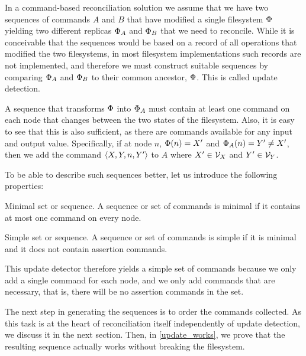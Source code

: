 
In a command-based reconciliation solution we assume that we have two sequences of commands
$A$ and $B$ that have modified a single filesystem $\Phi$ yielding two different replicas $\Phi_A$ and $\Phi_B$ that we
need to reconcile. While it is conceivable that the sequences would be based on a record of
all operations that modified the two filesystems, in most filesystem implementations
such records are not implemented, and therefore we must construct suitable sequences
by comparing $\Phi_A$ and $\Phi_B$ to their common ancestor, $\Phi$. This is called update detection.

A sequence that transforms $\Phi$ into $\Phi_A$ must contain at least one command on each node
that changes between the two states of the filesystem. Also, it is easy to see that this is also
sufficient, as there are commands available for any input and output value. 
Specifically, if at node $n$, $\Phi(n)=X'$ and $\Phi_A(n)=Y'\neq X'$, then we add the command $\langle{X,Y,n,Y'}\rangle$ to $A$
where $X'\in\mathcal{V}_{X}$ and $Y'\in\mathcal{V}_{Y}$.

To be able to describe such sequences better, let us introduce the following properties:

\begin{mydef}{Minimal set or sequence.}
A sequence or set of commands is minimal if it contains at most one command on every node.
\end{mydef}

\begin{mydef}{Simple set or sequence.}
A sequence or set of commands is simple if it is minimal and it does not contain assertion commands.
\end{mydef}

This update detector therefore yields a simple set of commands because we only add a single command
for each node, and we only add commands that are necessary, that is, there will be no 
assertion commands in the set.

The next step in generating the sequences is to order the commands collected.
As this task is at the heart of reconciliation itself independently of update detection,
we discuss it in the next section.
Then, in \cref{update_works}, we prove that the resulting sequence actually
works without breaking the filesystem.
